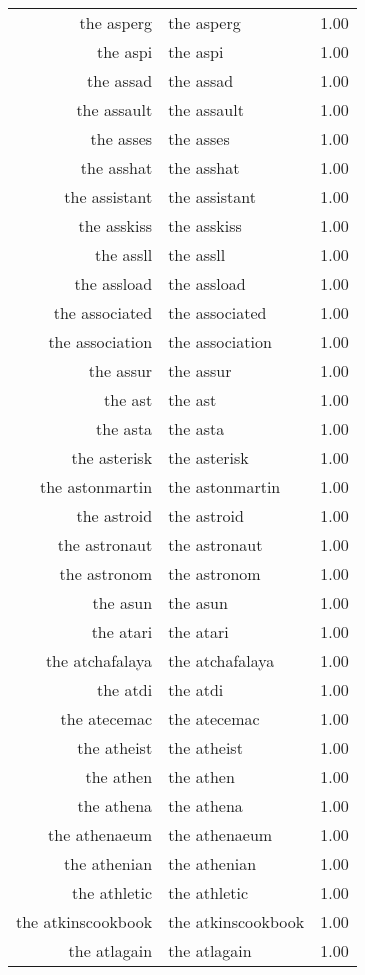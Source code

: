 \begin{table}[ht]
\begin{tabular}{rlr}
  the asperg & the asperg & 1.00 \\ 
  the aspi & the aspi & 1.00 \\ 
  the assad & the assad & 1.00 \\ 
  the assault & the assault & 1.00 \\ 
  the asses & the asses & 1.00 \\ 
  the asshat & the asshat & 1.00 \\ 
  the assistant & the assistant & 1.00 \\ 
  the asskiss & the asskiss & 1.00 \\ 
  the assll & the assll & 1.00 \\ 
  the assload & the assload & 1.00 \\ 
  the associated & the associated & 1.00 \\ 
  the association & the association & 1.00 \\ 
  the assur & the assur & 1.00 \\ 
  the ast & the ast & 1.00 \\ 
  the asta & the asta & 1.00 \\ 
  the asterisk & the asterisk & 1.00 \\ 
  the astonmartin & the astonmartin & 1.00 \\ 
  the astroid & the astroid & 1.00 \\ 
  the astronaut & the astronaut & 1.00 \\ 
  the astronom & the astronom & 1.00 \\ 
  the asun & the asun & 1.00 \\ 
  the atari & the atari & 1.00 \\ 
  the atchafalaya & the atchafalaya & 1.00 \\ 
  the atdi & the atdi & 1.00 \\ 
  the atecemac & the atecemac & 1.00 \\ 
  the atheist & the atheist & 1.00 \\ 
  the athen & the athen & 1.00 \\ 
  the athena & the athena & 1.00 \\ 
  the athenaeum & the athenaeum & 1.00 \\ 
  the athenian & the athenian & 1.00 \\ 
  the athletic & the athletic & 1.00 \\ 
  the atkinscookbook & the atkinscookbook & 1.00 \\ 
  the atlagain & the atlagain & 1.00 \\ 

\end{tabular}
\end{table}
